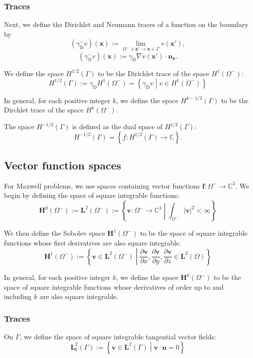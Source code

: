 \documentclass[a4paper]{book}
\begin{document}
\subsubsection{ Traces}Next, we define the Dirichlet and Neumann traces of a function on the boundary by
\[(\gamma^-_\text{D}v)(\mathbf{x}):=\lim_{\Omega^-\ni \mathbf{x}'\to \mathbf{x}\in\Gamma}v(\mathbf{x}'),\]
\[(\gamma^-_\text{N}v)(\mathbf{x}):=\gamma_\text{D}\nabla v(\mathbf{x'})\cdot\mathbf{n}_\mathbf{x}.\]

We define the space $H^{1/2}(\Gamma)$ to be the Dirichlet trace of the space $H^1(\Omega^-)$:
\[H^{1/2}(\Gamma):=\gamma_\text{D}H^1(\Omega^-)=\left\{\gamma_\text{D}v\middle|v\in H^1(\Omega^-)\right\}\]

In general, for each positive integer $k$, we define the space $H^{k-1/2}(\Gamma)$ to be the Dirchlet
trace of the space $H^k(\Omega^-)$.

The space $H^{-1/2}(\Gamma)$ is defined as the dual space of $H^{1/2}(\Gamma)$:
\[H^{-1/2}(\Gamma) = \left\{f:H^{1/2}(\Gamma)\to\mathbb{C}\right\}.\]

\subsection{ Vector function spaces}For Maxwell problems, we use spaces containing vector functions
$\mathbf{f}:\Omega^-\to\mathbb{C}^3$.
We begin by defining the space of square integrable functions:
\[\mathbf{H}^0(\Omega^-):=\mathbf{L}^2(\Omega^-):=\left\{\mathbf{v}:\Omega^-\to\mathbb{C}^3\middle|\int_{\Omega^-} |\mathbf{v}|^2<\infty\right\}\]

We then define the Sobolev space $\mathbf{H}^1(\Omega^-)$ to be the space of square integrable functions
whose first derivatives are also square integrable.
\[\mathbf{H}^1(\Omega^-):=\left\{\mathbf{v}\in \mathbf{L}^2(\Omega^-)\middle|\frac{\partial \mathbf{v}}{\partial x}, \frac{\partial \mathbf{v}}{\partial y}, \frac{\partial \mathbf{v}}{\partial z}\in \mathbf{L}^2(\Omega)\right\}\]

In general, for each positive integer $k$, we define the space $\mathbf{H}^k(\Omega^-)$ to be the space
of square integrable functions whose derivatives of order up to and including $k$ are also
square integrable.

\subsubsection{ Traces}On $\Gamma$, we define the space of square integrable tangential vector fields:
\[\mathbf{L}^2_\mathbf{t}(\Gamma):=\left\{\mathbf{v}\in\mathbf{L}^2(\Gamma)\middle|\mathbf{v}\cdot\mathbf{n}=0\right\}\]
\end{document}
